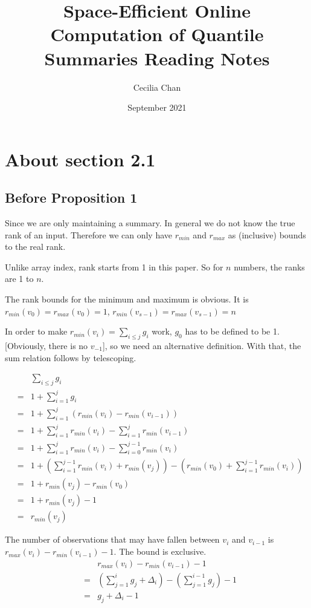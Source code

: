 \documentclass{article}
\title{Space-Efficient Online Computation of Quantile Summaries Reading Notes}
\author{Cecilia Chan}
\date{September 2021}
\begin{document}
\maketitle
\section*{About section 2.1}
\subsection*{Before Proposition 1}
Since we are only maintaining a summary. In general we do not know the true rank of an input. Therefore we can only have $ r_{min} $ and $ r_{max} $ as (inclusive) bounds to the real rank.

Unlike array index, rank starts from 1 in this paper. So for $ n $ numbers, the ranks are 1 to $ n $.

The rank bounds for the minimum and maximum is obvious. It is $ r_{min}(v_0) = r_{max}(v_0)= 1 $, $ r_{min}(v_{s-1}) = r_{max}(v_{s-1})= n $

In order to make $ r_{min}(v_i) = \sum\limits_{i \le j}g_i $ work, $ g_0 $ has to be defined to be 1. [Obviously, there is no $ v_{-1} $], so we need an alternative definition. With that, the sum relation follows by telescoping.

\begin{eqnarray*}
  & & \sum\limits_{i \le j}g_i \\
  &=& 1 + \sum\limits_{i=1}^{j}g_i \\
  &=& 1 + \sum\limits_{i=1}^{j}{\left(r_{min}(v_i) -r_{min}(v_{i-1})\right)} \\
  &=& 1 + \sum\limits_{i=1}^{j}{r_{min}(v_i)} - \sum\limits_{i=1}^{j}{r_{min}(v_{i-1})} \\
  &=& 1 + \sum\limits_{i=1}^{j}{r_{min}(v_i)} - \sum\limits_{i=0}^{j-1}{r_{min}(v_{i})} \\
  &=& 1 + \left(\sum\limits_{i=1}^{j-1}{r_{min}(v_i)} + r_{min}(v_j)\right) - \left(r_{min}(v_0) + \sum\limits_{i=1}^{j-1}{r_{min}(v_i)}\right) \\
  &=& 1 + r_{min}(v_j) - r_{min}(v_0) \\
  &=& 1 + r_{min}(v_j) - 1 \\
  &=& r_{min}(v_j)
\end{eqnarray*}

The number of observations that may have fallen between $ v_i $ and $ v_{i-1} $ is $ r_{max}(v_i) - r_{min}(v_{i-1}) - 1 $. The bound is exclusive.
\begin{eqnarray*}
  & & r_{max}(v_i) - r_{min}(v_{i-1}) - 1 \\
  &=& \left(\sum\limits_{j=1}^{i}g_j + \Delta_i\right) - \left(\sum\limits_{j=1}^{i-1}g_j\right) - 1\\
  &=& g_j + \Delta_i - 1
\end{eqnarray*}
\end{document}
